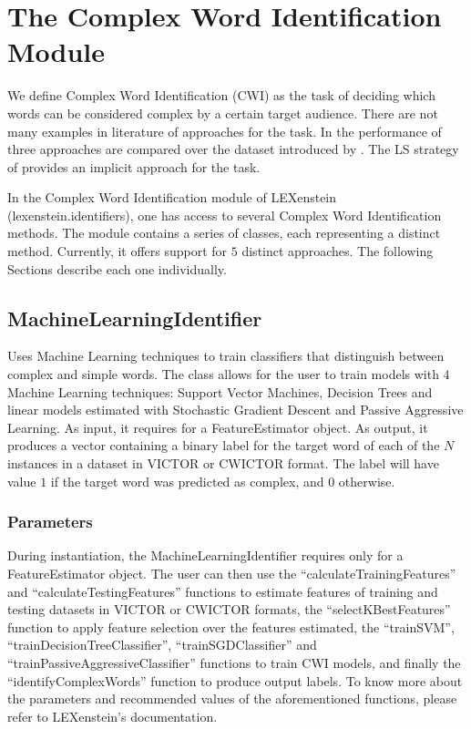 \chapter{The Complex Word Identification Module}
\label{cwi}

We define Complex Word Identification (CWI) as the task of deciding which words can be considered complex by a certain target audience. There are not many examples in literature of approaches for the task. In \cite{Shardlow2013cwi} the performance of three approaches are compared over the dataset introduced by \cite{cwcorpus}. The LS strategy of \cite{Horn2014} provides an implicit approach for the task.

In the Complex Word Identification module of LEXenstein (lexenstein.identifiers), one has access to several Complex Word Identification methods. The module contains a series of classes, each representing a distinct method. Currently, it offers support for $5$ distinct approaches. The following Sections describe each one individually.

\section{MachineLearningIdentifier}

Uses Machine Learning techniques to train classifiers that distinguish between complex and simple words. The class allows for the user to train models with $4$ Machine Learning techniques: Support Vector Machines, Decision Trees and linear models estimated with Stochastic Gradient Descent and Passive Aggressive Learning. As input, it requires for a FeatureEstimator object. As output, it produces a vector containing a binary label for the target word of each of the $N$ instances in a dataset in VICTOR or CWICTOR format. The label will have value $1$ if the target word was predicted as complex, and $0$ otherwise.

\subsection{Parameters}

During instantiation, the MachineLearningIdentifier requires only for a FeatureEstimator object. The user can then use the ``calculateTrainingFeatures'' and ``calculateTestingFeatures'' functions to estimate features of training and testing datasets in VICTOR or CWICTOR formats, the ``selectKBestFeatures'' function to apply feature selection over the features estimated, the ``trainSVM'', ``trainDecisionTreeClassifier'', ``trainSGDClassifier'' and ``trainPassiveAggressiveClassifier'' functions to train CWI models, and finally the ``identifyComplexWords'' function to produce output labels. To know more about the parameters and recommended values of the aforementioned functions, please refer to LEXenstein's documentation.


